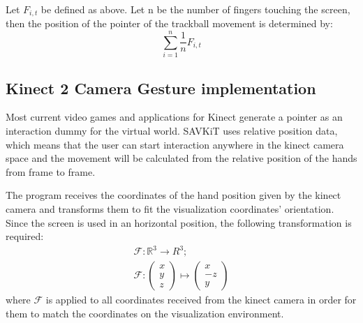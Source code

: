 \documentclass[12pt]{extarticle}
\newcommand{\R}{\mathbb{R}}
\begin{document}
\begin{appendices}
Let $F_{i,t}$ be defined as above. Let n be the number of fingers touching the screen, then the position of the pointer of the trackball movement is determined by:
$$\sum_{i=1}^n \frac{1}{n}F_{i,t}$$

\subsection {Kinect 2 Camera Gesture implementation}\label{KinectGestures}
Most current video games and applications for Kinect generate a pointer as an interaction dummy for the virtual world. SAVKiT uses relative position data, which means that the user can start interaction anywhere in the kinect camera space and the movement will be calculated from the relative position of the hands from frame to frame.

The program receives the coordinates of the hand position given by the kinect camera and transforms them to fit the visualization coordinates' orientation. Since the screen is used in an horizontal position, the following transformation is required:
$$\begin{array}{c}
\mathcal F: \R^3\to R^3; \\
\mathcal F:\begin{pmatrix} x\\y\\z\end{pmatrix}\mapsto \begin{pmatrix} x\\-z\\y\end{pmatrix}\end{array}$$
where $\mathcal F$ is applied to all coordinates received from the kinect camera in order for them to match the coordinates on the visualization environment.


\end{appendices}
\end{document}
